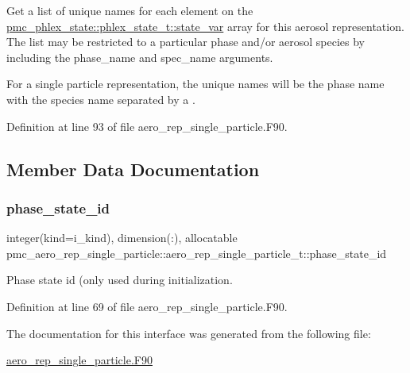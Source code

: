 Get a list of unique names for each element on the {\ttfamily \mbox{\hyperlink{structpmc__phlex__state_1_1phlex__state__t_a78835cb552d483ebbfc7a6bc6f756918}{pmc\+\_\+phlex\+\_\+state\+::phlex\+\_\+state\+\_\+t\+::state\+\_\+var}}} array for this aerosol representation. The list may be restricted to a particular phase and/or aerosol species by including the phase\+\_\+name and spec\+\_\+name arguments. 

For a single particle representation, the unique names will be the phase name with the species name separated by a \textquotesingle{}.\textquotesingle{} 

Definition at line 93 of file aero\+\_\+rep\+\_\+single\+\_\+particle.\+F90.



\subsection{Member Data Documentation}
\mbox{\label{structpmc__aero__rep__single__particle_1_1aero__rep__single__particle__t_af8b5f9b96f449c78b9f43845fbf403c4}} 
\subsubsection{\texorpdfstring{phase\+\_\+state\+\_\+id}{phase\_state\_id}}
{\footnotesize\ttfamily integer(kind=i\+\_\+kind), dimension(\+:), allocatable pmc\+\_\+aero\+\_\+rep\+\_\+single\+\_\+particle\+::aero\+\_\+rep\+\_\+single\+\_\+particle\+\_\+t\+::phase\+\_\+state\+\_\+id\hspace{0.3cm}{\ttfamily [private]}}



Phase state id (only used during initialization. 



Definition at line 69 of file aero\+\_\+rep\+\_\+single\+\_\+particle.\+F90.



The documentation for this interface was generated from the following file\+:\begin{DoxyCompactItemize}
\item 
\mbox{\hyperlink{aero__rep__single__particle_8_f90}{aero\+\_\+rep\+\_\+single\+\_\+particle.\+F90}}\end{DoxyCompactItemize}
